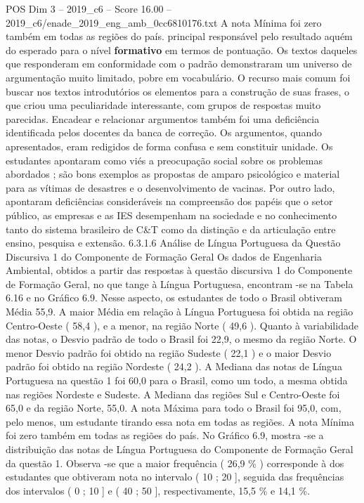 \begin{textsample}{POS Dim 3 – 2019\_c6 – Score 16.00 – 2019\_c6/enade\_2019\_eng\_amb\_0cc6810176.txt}
A nota Mínima foi zero também em todas as regiões do país. principal responsável pelo resultado aquém do esperado para o nível \textbf{formativo} em termos de pontuação.
Os textos daqueles que responderam em conformidade com o padrão demonstraram um universo de argumentação muito limitado, pobre em vocabulário.
O recurso mais comum foi buscar nos textos introdutórios os elementos para a construção de suas frases, o que criou uma peculiaridade interessante, com grupos de respostas muito parecidas.
Encadear e relacionar argumentos também foi uma deficiência identificada pelos docentes da banca de correção.
Os argumentos, quando apresentados, eram redigidos de forma confusa e sem constituir unidade.
Os estudantes apontaram como viés a preocupação social sobre os problemas abordados ; são bons exemplos as propostas de amparo psicológico e material para as vítimas de desastres e o desenvolvimento de vacinas.
Por outro lado, apontaram deficiências consideráveis na compreensão dos papéis que o setor público, as empresas e as IES desempenham na sociedade e no conhecimento tanto do sistema brasileiro de C\&T como da distinção e da articulação entre ensino, pesquisa e extensão. 6.3.1.6 Análise de Língua Portuguesa da Questão Discursiva 1 do Componente de Formação Geral Os dados de Engenharia Ambiental, obtidos a partir das respostas à questão discursiva 1 do Componente de Formação Geral, no que tange à Língua Portuguesa, encontram -se na Tabela 6.16 e no Gráfico 6.9.
Nesse aspecto, os estudantes de todo o Brasil obtiveram Média 55,9.
A maior Média em relação à Língua Portuguesa foi obtida na região Centro-Oeste ( 58,4 ), e a menor, na região Norte ( 49,6 ).
Quanto à variabilidade das notas, o Desvio padrão de todo o Brasil foi 22,9, o mesmo da região Norte.
O menor Desvio padrão foi obtido na região Sudeste ( 22,1 ) e o maior Desvio padrão foi obtido na região Nordeste ( 24,2 ).
A Mediana das notas de Língua Portuguesa na questão 1 foi 60,0 para o Brasil, como um todo, a mesma obtida nas regiões Nordeste e Sudeste.
A Mediana das regiões Sul e Centro-Oeste foi 65,0 e da região Norte, 55,0.
A nota Máxima para todo o Brasil foi 95,0, com, pelo menos, um estudante tirando essa nota em todas as regiões.
A nota Mínima foi zero também em todas as regiões do país.
No Gráfico 6.9, mostra -se a distribuição das notas de Língua Portuguesa do Componente de Formação Geral da questão 1.
Observa -se que a maior frequência ( 26,9 \% ) corresponde à dos estudantes que obtiveram nota no intervalo ( 10 ; 20 ], seguida das frequências dos intervalos ( 0 ; 10 ] e ( 40 ; 50 ], respectivamente, 15,5 \% e 14,1 \%.

\end{textsample}
